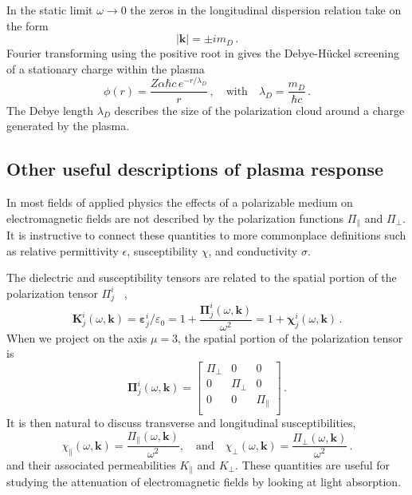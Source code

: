 In the static limit $\omega \rightarrow 0$ the zeros in the longitudinal dispersion relation take on the form
\begin{equation}
    |\mathbf{k}| = \pm  i m_D \,.
\end{equation}
Fourier transforming using the positive root in  gives the Debye-H\"uckel screening of a stationary charge within the plasma \cite{Debye:1923}
\begin{equation}
    \phi(r) = \frac{Z \alpha \hbar c \, e^{-r/\lambda_D}}{r}\,, \quad \text{with} \quad  \lambda_D = \frac{m_D}{\hbar c}\,.
\end{equation}
The Debye length $\lambda_D$ describes the size of the polarization cloud around a charge generated by the plasma.
\subsection{Other useful descriptions of plasma response}

In most fields of applied physics the effects of a polarizable medium on electromagnetic fields are not described by the polarization functions $\Pi_\parallel$ and $\Pi_\perp$. It is instructive to connect these quantities to more commonplace definitions such as relative permittivity $\epsilon$, susceptibility $\chi$, and conductivity $\sigma$.

The dielectric and susceptibility tensors are related to the spatial portion of the polarization tensor $\Pi^i_j$ ~\cite{Starke:2014tfa,melrose2008quantum},
\begin{equation}\label{dielten}
     \boldsymbol{K}^i_j(\omega,\boldsymbol{k}) = \boldsymbol{\varepsilon}^i_j/\varepsilon_0 = 1+\frac{\boldsymbol{\Pi}^i_j(\omega,\boldsymbol{k})}{\omega^2} = 1+\boldsymbol{\chi}^i_j(\omega,\boldsymbol{k})\,.
\end{equation}
When we project on the axis $\mu =3$, the spatial portion of the polarization tensor is
 \begin{equation}
    \boldsymbol{\Pi}^{i}_{j}(\omega,\boldsymbol{k}) = \left[
    \begin{array}{ccc}
  \Pi_{\perp} & 0 & 0 \\
  0 & \Pi_{\perp} & 0 \\
  0& 0 & \Pi_{\parallel} \\ 
\end{array}
\right]\,.
\end{equation}
It is then natural to discuss transverse and longitudinal susceptibilities,
\begin{equation}\label{eq:chi}
    \chi_\parallel(\omega,\boldsymbol{k}) =\frac{\Pi_\parallel(\omega,\boldsymbol{k})}{\omega^2}, \quad \text{and} \quad \chi_\perp(\omega,\boldsymbol{k}) = \frac{\Pi_\perp(\omega,\boldsymbol{k})}{\omega^2}\,.
\end{equation}
and their associated permeabilities $K_\parallel$ and $K_\perp$. These quantities are useful for studying the attenuation of electromagnetic fields by looking at light absorption.

